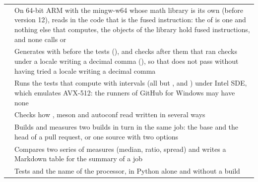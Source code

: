 \begin{longtable}{L{5cm}L{8.8cm}}
   & On 64-bit ARM with the mingw-w64 whose math library is its own (before version 12), reads in the code that  is the fused instruction: the  of  is one  and nothing else that computes, the objects of the library hold fused instructions, and none calls  or \\
   & Generates  with  before the tests (), and checks after them that  ran checks under a locale writing a
decimal comma (), so that  does not pass without having tried a locale writing a decimal comma\\
   & Runs the tests that compute with intervals (all
    but ,  and ) under Intel SDE,
    which emulates AVX-512: the runners of GitHub for Windows may have none\\
   & Checks how , meson and
    autoconf read  written in several ways\\
   & Builds and measures two builds in turn
    in the same job: the base and the head of a pull request, or one source
    with two options\\
   & Compares two series of measures
    (median, ratio, spread) and writes a Markdown table for the summary of
    a job\\
   & Tests
     and the name of the processor, in Python
    alone and without a build\\
\end{longtable}
\endgroup

